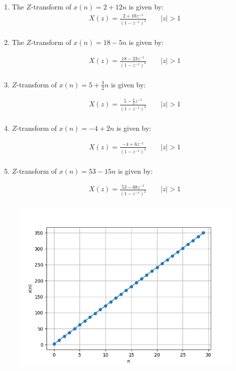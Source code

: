 \documentclass[journal,12pt,twocolumn]{IEEEtran}
\theoremstyle{remark}
\begin{document}
\begin{enumerate}
 \item 
The $Z$-transform of $x(n) = 2 + 12n$ is given by:
\begin{align}
    &X(z)=\frac{2+{10z^{-1}}}{(1-{z^{-1}})^2}  \qquad|z|>1 \\
\end{align}
\item
The $Z$-transform of $x(n) = 18 - 5n$ is given by:

\begin{align}
    &X(z)=\frac{18-{23z^{-1}}}{(1-{z^{-1}})^2} \qquad  |z|>1 \\
\end{align}
\item 
$Z$-transform of $x(n) = 5 + \frac{3}{2}n$ is given by:

\begin{align}
    &X(z)=\frac{5-\frac{7}{2}{z^{-1}}}{(1-{z^{-1}})^2} \qquad |z|>1\\
\end{align}
\item 

\vspace{2cm}
$Z$-transform of $x(n) = -4 + 2n$ is given by:

\begin{align}
       &X(z)=\frac{-4+6{z^{-1}}}{(1-{z^{-1}})^2} \qquad  |z|>1\\
\end{align}
\item 
$Z$-transform of $x(n) = 53 - 15n$ is given by:

\begin{align}
       &X(z)=\frac{53-68{z^{-1}}}{(1-{z^{-1}})^2}\qquad|z|>1\\
\end{align}
\end{enumerate}

\begin{figure}[h]
       \vspace*{-1cm}
       \centering
        \includegraphics[width=0.8\linewidth]{figs/download.png} %
        \caption{}
\end{figure}
\end{document}
